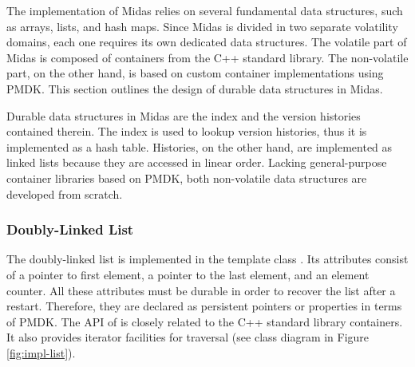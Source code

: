 
The implementation of Midas relies on several fundamental data structures, such
as arrays, lists, and hash maps. Since Midas is divided in two separate
volatility domains, each one requires its own dedicated data structures. The
volatile part of Midas is composed of containers from the C++ standard library.
The non-volatile part, on the other hand, is based on custom container
implementations using PMDK. This section outlines the design of durable data
structures in Midas.


Durable data structures in Midas are the index and the version histories
contained therein. The index is used to lookup version histories, thus it is
implemented as a hash table. Histories, on the other hand, are implemented as
linked lists because they are accessed in linear order. Lacking general-purpose
container libraries based on PMDK, both non-volatile data structures are
developed from scratch.

\subsubsection{Doubly-Linked List}

The doubly-linked list is implemented in the template class . Its
attributes consist of a pointer to first element, a pointer to the last element,
and an element counter. All these attributes must be durable in order to recover
the list after a restart. Therefore, they are declared as persistent pointers or
properties in terms of PMDK. The API of  is closely related to the
C++ standard library containers. It also provides iterator facilities for
traversal (see class diagram in Figure \ref{fig:impl-list}).

